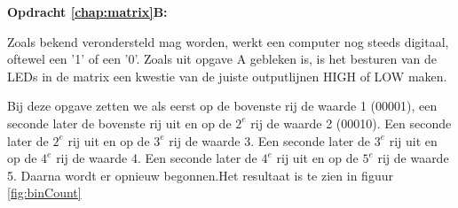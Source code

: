 \textbf{Opdracht \ref{chap:matrix}B:}

	 Zoals bekend verondersteld mag worden, werkt een computer nog steeds digitaal, oftewel een '1' of een '0'.
	Zoals uit opgave A gebleken is, is het besturen van de LEDs in de matrix een kwestie van de juiste outputlijnen \textcolor{arduinoBlue}{HIGH} of \textcolor{arduinoBlue}{LOW} maken.
	
	Bij deze opgave zetten we als eerst op de bovenste rij de waarde 1 (00001), een seconde later de bovenste rij uit en op de $2^{e}$ rij de waarde 2 (00010). Een seconde later de $2^{e}$ rij uit en op de $3^{e}$ rij de waarde 3.
	Een seconde later de $3^{e}$ rij uit en op de $4^{e}$ rij de waarde 4.
	Een seconde later de $4^{e}$ rij uit en op de $5^{e}$ rij de waarde 5.
	Daarna wordt er opnieuw begonnen.Het resultaat is te zien in figuur \ref{fig:binCount}
	

